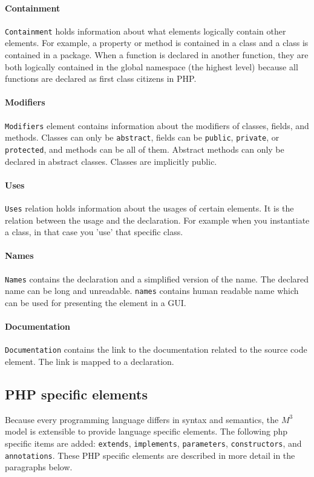 \documentclass[../main.tex]{subfiles}
\begin{document}
    \paragraph{Containment} \texttt{Containment} holds information about what elements logically contain other elements.
    For example, a property or method is contained in a class and a class is contained in a package.
    When a function is declared in another function, they are both logically contained in the global namespace (the highest level) because all functions are declared as first class citizens in PHP.
    
    \paragraph{Modifiers} \texttt{Modifiers} element contains information about the modifiers of classes, fields, and methods. 
    Classes can only be \texttt{abstract}, fields can be \texttt{public}, \texttt{private}, or \texttt{protected}, and methods can be all of them. 
    Abstract methods can only be declared in abstract classes. 
    Classes are implicitly public.
    
    \paragraph{Uses} \texttt{Uses} relation holds information about the usages of certain elements.
    It is the relation between the usage and the declaration.
    For example when you instantiate a class, in that case you 'use' that specific class.
     
    \paragraph{Names} \texttt{Names} contains the declaration and a simplified version of the name.
    The declared name can be long and unreadable.
    \texttt{names} contains human readable name which can be used for presenting the element in a GUI.
    
    \paragraph{Documentation} \texttt{Documentation} contains the link to the documentation related to the source code element.
    The link is mapped to a declaration.
    
    \subsection{PHP specific elements}
    Because every programming language differs in syntax and semantics, the $M^3$ model is extensible to provide language specific elements.
    The following php specific items are added: \texttt{extends}, \texttt{implements}, \texttt{parameters}, \texttt{constructors}, and \texttt{annotations}.
    These PHP specific elements are described in more detail in the paragraphs below.
\end{document}
